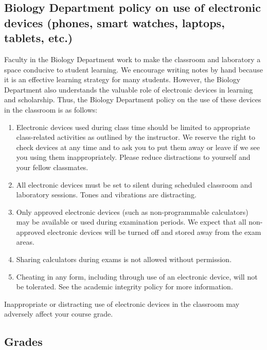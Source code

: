 \documentclass{tufte-handout}
\begin{document}
\begin{fullwidth}

\subsection{Biology Department policy on use of electronic devices (phones, smart watches, laptops, tablets, etc.)}

Faculty in the Biology Department work to make the classroom and laboratory a space conducive to student learning. We encourage writing notes by hand because it is an effective learning strategy for many students. However, the Biology Department also understands the valuable role of electronic devices in learning and scholarship. Thus, the Biology Department policy on the use of these devices in the classroom is as follows:


\begin{enumerate}
\item Electronic devices used during class time should be limited to appropriate class-related activities as outlined by the instructor. We reserve the right to check devices at any time and to ask you to put them away or leave if we see you using them inappropriately. Please reduce distractions to yourself and your fellow classmates.
\item All electronic devices must be set to silent during scheduled classroom and laboratory sessions. Tones and vibrations are distracting.
\item Only approved electronic devices (such as non-programmable calculators) may be available or used during examination periods. We expect that all non-approved electronic devices will be turned off and stored away from the exam areas.
\item Sharing calculators during exams is not allowed without permission. 
\item Cheating in any form, including through use of an electronic device, will not be tolerated. See the academic integrity policy for more information.
\end{enumerate}

Inappropriate or distracting use of electronic devices in the classroom may adversely affect your course grade. 

\end{fullwidth}

\subsection{Grades}
\end{document}
